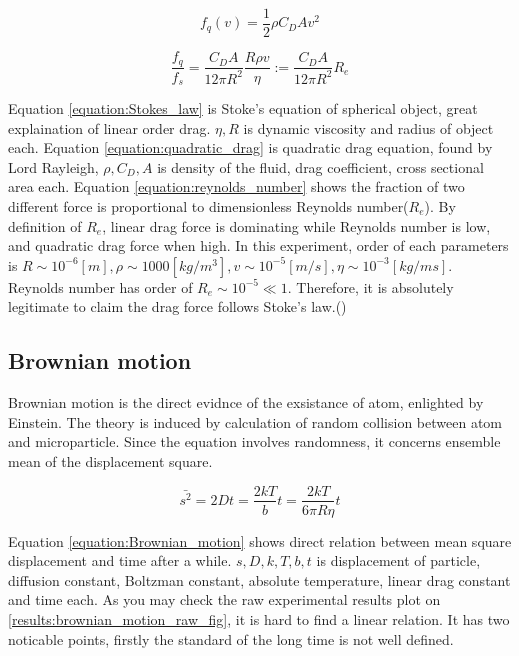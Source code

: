 \documentclass{article}
\begin{document}
\begin{equation}
    f_q(v) = \frac{1}{2} \rho C_D A v^2
\label{equation:quadratic_drag}
\end{equation}

\begin{equation}
    \frac{f_q}{f_s} = \frac{C_D A}{12 \pi R^2} \frac{R \rho v}{\eta} := \frac{C_D A}{12 \pi R^2} R_e 
\label{equation:reynolds_number}
\end{equation}

Equation \ref{equation:Stokes_law} is Stoke's equation of spherical object, great explaination of linear order drag. $\eta, R$ is dynamic viscosity and radius of object each.
Equation \ref{equation:quadratic_drag} is quadratic drag equation, found by Lord Rayleigh, $\rho, C_D, A$ is density of the fluid, drag coefficient, cross sectional area each.
Equation \ref{equation:reynolds_number} shows the fraction of two different force is proportional to dimensionless Reynolds number($R_e$).
By definition of $R_e$, linear drag force is dominating while Reynolds number is low, and quadratic drag force when high.
In this experiment, order of each parameters is $R \sim 10^{-6} [m], \rho \sim 1000 [kg/m^3], v \sim 10^{-5} [m/s],\eta \sim 10^{-3} [kg / m s]$.
Reynolds number has order of $R_e \sim 10^{-5} \ll 1$.
Therefore, it is absolutely legitimate to claim the drag force follows Stoke's law.(\cite{Reynolds_number})

\subsection{Brownian motion}
\label{intro:Brownian_motion}

Brownian motion is the direct evidnce of the exsistance of atom, enlighted by Einstein.
The theory is induced by calculation of random collision between atom and microparticle.
Since the equation involves randomness, it concerns ensemble mean of the displacement square.

\begin{equation}
    \bar{s^2}= 2Dt =  \frac{2kT}{b} t  = \frac{2kT}{6 \pi R \eta} t
\label{equation:Brownian_motion}
\end{equation}

Equation \ref{equation:Brownian_motion} shows direct relation between mean square displacement and time after a while.
$s, D, k, T, b, t$ is displacement of particle, diffusion constant, Boltzman constant, absolute temperature, linear drag constant and time each.
As you may check the raw experimental results plot on \ref{results:brownian_motion_raw_fig}, it is hard to find a linear relation.
It has two noticable points, firstly the standard of the long time is not well defined.
\end{document}
